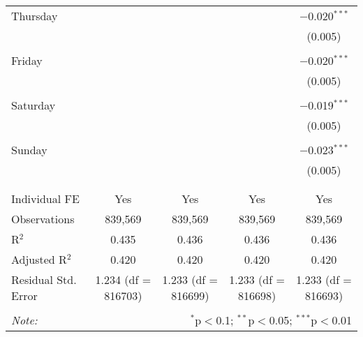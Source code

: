 \documentclass[
]{article}
\begin{document}
\begin{table}[!htbp]
{\begin{tabular}{@{\extracolsep{5pt}}lcccc}
 Thursday &  &  &  & $-$0.020$^{***}$ \\ 
  &  &  &  & (0.005) \\ 
  & & & & \\ 
 Friday &  &  &  & $-$0.020$^{***}$ \\ 
  &  &  &  & (0.005) \\ 
  & & & & \\ 
 Saturday &  &  &  & $-$0.019$^{***}$ \\ 
  &  &  &  & (0.005) \\ 
  & & & & \\ 
 Sunday &  &  &  & $-$0.023$^{***}$ \\ 
  &  &  &  & (0.005) \\ 
  & & & & \\ 
\hline \\[-1.8ex] 
Individual FE & Yes & Yes & Yes & Yes \\ 
Observations & 839,569 & 839,569 & 839,569 & 839,569 \\ 
R$^{2}$ & 0.435 & 0.436 & 0.436 & 0.436 \\ 
Adjusted R$^{2}$ & 0.420 & 0.420 & 0.420 & 0.420 \\ 
Residual Std. Error & 1.234 (df = 816703) & 1.233 (df = 816699) & 1.233 (df = 816698) & 1.233 (df = 816693) \\ 
\hline 
\hline \\[-1.8ex] 
\textit{Note:}  & \multicolumn{4}{r}{$^{*}$p$<$0.1; $^{**}$p$<$0.05; $^{***}$p$<$0.01} \\ 
\end{tabular}
} 
\end{table} 
\newpage
\end{document}
